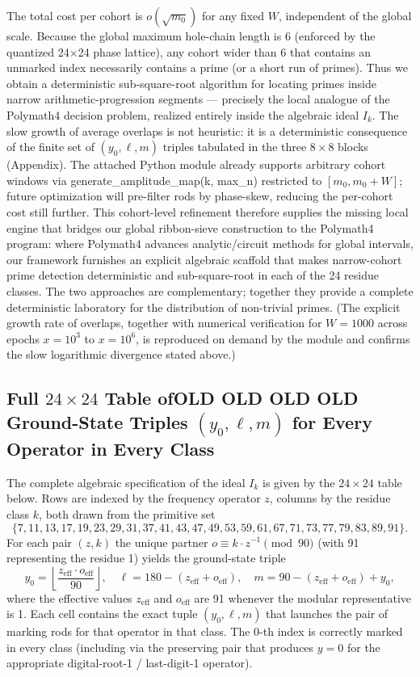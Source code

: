 \documentclass[11pt,a4paper]{article}
\begin{document}
The total cost per cohort is $  o(\sqrt{m_0})  $ for any fixed $  W  $, independent of the global scale. Because the global maximum hole-chain length is 6 (enforced by the quantized 24×24 phase lattice), any cohort wider than 6 that contains an unmarked index necessarily contains a prime (or a short run of primes). Thus we obtain a deterministic sub-square-root algorithm for locating primes inside narrow arithmetic-progression segments — precisely the local analogue of the Polymath4 decision problem, realized entirely inside the algebraic ideal $  I_k  $.
The slow growth of average overlaps is not heuristic: it is a deterministic consequence of the finite set of $  (y_0,\ell,m)  $ triples tabulated in the three $  8\times8  $ blocks (Appendix). The attached Python module already supports arbitrary cohort windows via generate_amplitude_map(k, max_n) restricted to $  [m_0, m_0+W]  $; future optimization will pre-filter rods by phase-skew, reducing the per-cohort cost still further.
This cohort-level refinement therefore supplies the missing local engine that bridges our global ribbon-sieve construction to the Polymath4 program: where Polymath4 advances analytic/circuit methods for global intervals, our framework furnishes an explicit algebraic scaffold that makes narrow-cohort prime detection deterministic and sub-square-root in each of the 24 residue classes. The two approaches are complementary; together they provide a complete deterministic laboratory for the distribution of non-trivial primes.
(The explicit growth rate of overlaps, together with numerical verification for $  W=1000  $ across epochs $  x=10^3  $ to $  x=10^6  $, is reproduced on demand by the module and confirms the slow logarithmic divergence stated above.)





\subsection{Full \(24 \times 24\) Table ofOLD OLD OLD OLD Ground-State Triples \((y_0, \ell, m)\) for Every Operator in Every Class}

The complete algebraic specification of the ideal \(I_k\) is given by the \(24 \times 24\) table below. Rows are indexed by the frequency operator \(z\), columns by the residue class \(k\), both drawn from the primitive set
\[
\{7,11,13,17,19,23,29,31,37,41,43,47,49,53,59,61,67,71,73,77,79,83,89,91\}.
\]
For each pair \((z,k)\) the unique partner \(o \equiv k \cdot z^{-1} \pmod{90}\) (with 91 representing the residue 1) yields the ground-state triple
\[
y_0 = \left\lfloor \frac{z_{\mathrm{eff}} \cdot o_{\mathrm{eff}}}{90} \right\rfloor, \quad
\ell = 180 - (z_{\mathrm{eff}} + o_{\mathrm{eff}}), \quad
m = 90 - (z_{\mathrm{eff}} + o_{\mathrm{eff}}) + y_0,
\]
where the effective values \(z_{\mathrm{eff}}\) and \(o_{\mathrm{eff}}\) are 91 whenever the modular representative is 1. Each cell contains the exact tuple \((y_0,\ell,m)\) that launches the pair of marking rods for that operator in that class. The 0-th index is correctly marked in every class (including via the preserving pair that produces \(y=0\) for the appropriate digital-root-1 / last-digit-1 operator).
\end{document}

